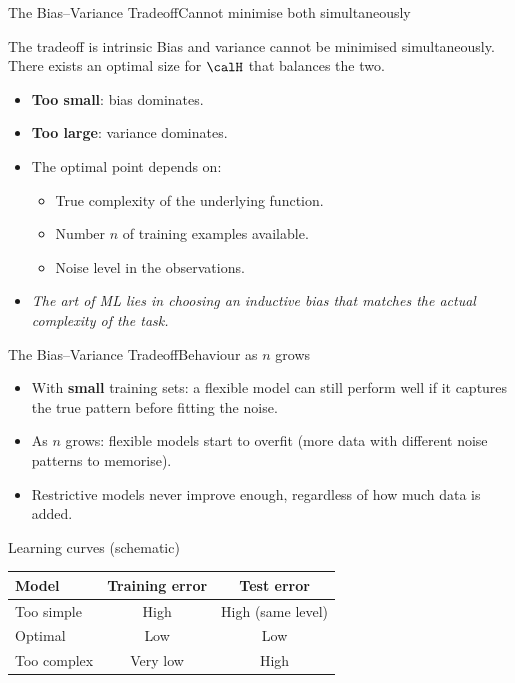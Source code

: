 \begin{frame}{The Bias–Variance Tradeoff}{Cannot minimise both simultaneously}
  \begin{alertblock}{The tradeoff is intrinsic}
    Bias and variance cannot be minimised simultaneously. There exists an optimal size for
    $\calH$ that balances the two.
  \end{alertblock}
  \bigskip
  \begin{itemize}
    \item \textbf{Too small}: bias dominates.
    \item \textbf{Too large}: variance dominates.
    \item The optimal point depends on:
      \begin{itemize}
        \item True complexity of the underlying function.
        \item Number $n$ of training examples available.
        \item Noise level in the observations.
      \end{itemize}
    \item \emph{The art of ML lies in choosing an inductive bias that matches the actual
          complexity of the task.}
  \end{itemize}
\end{frame}

\begin{frame}{The Bias–Variance Tradeoff}{Behaviour as $n$ grows}
  \begin{itemize}
    \item With \textbf{small} training sets: a flexible model can still perform well if it
          captures the true pattern before fitting the noise.
    \item As $n$ grows: flexible models start to overfit (more data with different noise
          patterns to memorise).
    \item Restrictive models never improve enough, regardless of how much data is added.
  \end{itemize}
  \bigskip
  \begin{block}{Learning curves (schematic)}
    \centering
    \begin{tabular}{lcc}
      \toprule
      \textbf{Model} & \textbf{Training error} & \textbf{Test error}\\
      \midrule
      Too simple   & High      & High (same level)\\
      Optimal      & Low       & Low\\
      Too complex  & Very low  & High\\
      \bottomrule
    \end{tabular}
  \end{block}
\end{frame}

